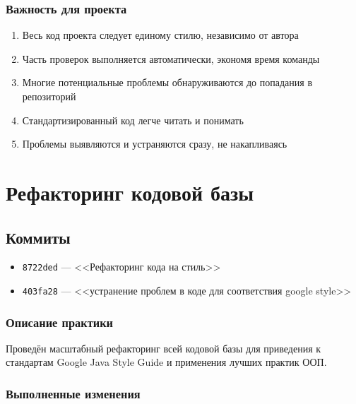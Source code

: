 \documentclass{article}
\begin{document}
\subsubsection{Важность для проекта}
    \begin{enumerate}
    \item Весь код проекта следует единому стилю, независимо от автора
    \item Часть проверок выполняется автоматически, экономя время команды
    \item Многие потенциальные проблемы обнаруживаются до попадания в репозиторий
    \item Стандартизированный код легче читать и понимать
    \item Проблемы выявляются и устраняются сразу, не накапливаясь
    \end{enumerate}

\section{Рефакторинг кодовой базы}

\subsection{Коммиты}
    \begin{itemize}
        \item \texttt{8722ded} --- <<Рефакторинг кода на стиль>>
        \item \texttt{403fa28} --- <<устранение проблем в коде для соответствия google style>>
    \end{itemize}

\subsubsection{Описание практики}
Проведён масштабный рефакторинг всей кодовой базы для приведения к стандартам Google Java Style Guide и применения лучших практик ООП.

\subsubsection{Выполненные изменения}
\end{document}
